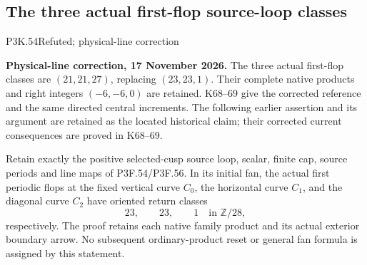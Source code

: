 \subsection{The three actual first-flop source-loop classes}
\begin{statement}{P3K.54}{Refuted; physical-line correction}\par\noindent\textbf{Physical-line correction, 17 November 2026.} The three actual first-flop classes are \((21,21,27)\), replacing \((23,23,1)\). Their complete native products and right integers \((-6,-6,0)\) are retained. K68--69 give the corrected reference and the same directed central increments. The following earlier assertion and its argument are retained as the located historical claim; their corrected current consequences are proved in K68--69.\medskip\par 
Retain exactly the positive selected-cusp source loop, scalar, finite cap,
source periods and line maps of P3F.54/P3F.56. In its initial fan,
the actual first periodic flops at the fixed vertical curve \(C_0\),
the horizontal curve \(C_1\), and the diagonal curve \(C_2\) have
oriented return classes
\[
 23,\qquad23,\qquad1\quad\text{in }\mathbb Z/28,
\]
respectively. The proof retains each native family product and its
actual exterior boundary arrow. No subsequent ordinary-product
reset or general fan formula is assigned by this statement.
\end{statement}
